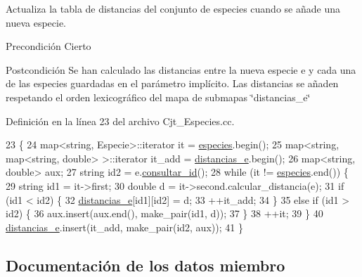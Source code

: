 Actualiza la tabla de distancias del conjunto de especies cuando se añade una nueva especie. 

\begin{DoxyPrecond}{Precondición}
Cierto 
\end{DoxyPrecond}
\begin{DoxyPostcond}{Postcondición}
Se han calculado las distancias entre la nueva especie e y cada una de las especies guardadas en el parámetro implícito. Las distancias se añaden respetando el orden lexicográfico del mapa de submapas \char`\"{}distancias\+\_\+e\char`\"{} 
\end{DoxyPostcond}


Definición en la línea 23 del archivo Cjt\+\_\+\+Especies.\+cc.


\begin{DoxyCode}
23                                                          \{
24   map<string, Especie>::iterator it = \hyperlink{class_cjt___especies_a8f319699bd2e8a42b85ec47b67c17563}{especies}.begin();
25   map<string, map<string, double> >::iterator it\_add = \hyperlink{class_cjt___especies_ad1c8837b7e76b9a7610b65209aa7f5e9}{distancias\_e}.begin();
26   map<string, double> aux;
27   \textcolor{keywordtype}{string} id2 = e.\hyperlink{class_especie_a1652f05cd2ff7dc71123bf538ecc4476}{consultar\_id}();
28   \textcolor{keywordflow}{while} (it != \hyperlink{class_cjt___especies_a8f319699bd2e8a42b85ec47b67c17563}{especies}.end()) \{
29     \textcolor{keywordtype}{string} id1 = it->first;
30     \textcolor{keywordtype}{double} d = it->second.calcular\_distancia(e);
31     \textcolor{keywordflow}{if} (id1 < id2) \{
32       \hyperlink{class_cjt___especies_ad1c8837b7e76b9a7610b65209aa7f5e9}{distancias\_e}[id1][id2] = d;
33       ++it\_add;
34     \}
35     \textcolor{keywordflow}{else} \textcolor{keywordflow}{if} (id1 > id2) \{
36       aux.insert(aux.end(), make\_pair(id1, d));
37     \}
38     ++it;
39   \}
40   \hyperlink{class_cjt___especies_ad1c8837b7e76b9a7610b65209aa7f5e9}{distancias\_e}.insert(it\_add, make\_pair(id2, aux));
41 \}
\end{DoxyCode}


\subsection{Documentación de los datos miembro}
\mbox{\label{class_cjt___especies_a4586fb4724b7af4b7f00bb0c0bdd6a17}} 
